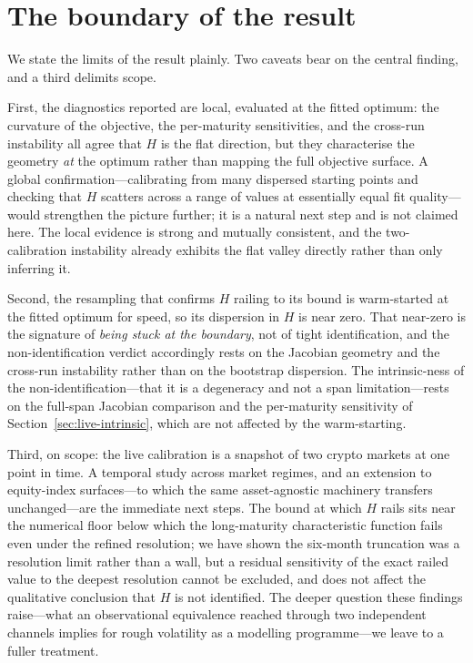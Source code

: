 \documentclass[11pt,a4paper]{article}
\numberwithin{equation}{section}
\begin{document}
\section{The boundary of the result}\label{sec:limitations}

We state the limits of the result plainly. Two caveats bear on the central finding, and a third
delimits scope.

First, the diagnostics reported are local, evaluated at the fitted optimum: the curvature of the
objective, the per-maturity sensitivities, and the cross-run instability all agree that $H$ is the
flat direction, but they characterise the geometry \emph{at} the optimum rather than mapping the full
objective surface. A global confirmation---calibrating from many dispersed starting points and
checking that $H$ scatters across a range of values at essentially equal fit quality---would
strengthen the picture further; it is a natural next step and is not claimed here. The local evidence
is strong and mutually consistent, and the two-calibration instability already exhibits the flat
valley directly rather than only inferring it.

Second, the resampling that confirms $H$ railing to its bound is warm-started at the fitted optimum for
speed, so its dispersion in $H$ is near zero. That near-zero is the signature of \emph{being stuck at
the boundary}, not of tight identification, and the non-identification verdict accordingly rests on the
Jacobian geometry and the cross-run instability rather than on the bootstrap dispersion. The
intrinsic-ness of the non-identification---that it is a degeneracy and not a span limitation---rests on
the full-span Jacobian comparison and the per-maturity sensitivity of Section~\ref{sec:live-intrinsic},
which are not affected by the warm-starting.

Third, on scope: the live calibration is a snapshot of two crypto markets at one point in time. A
temporal study across market regimes, and an extension to equity-index surfaces---to which the same
asset-agnostic machinery transfers unchanged---are the immediate next steps. The bound at which $H$
rails sits near the numerical floor below which the long-maturity characteristic function fails even
under the refined resolution; we have shown the six-month truncation was a resolution limit rather than
a wall, but a residual sensitivity of the exact railed value to the deepest resolution cannot be
excluded, and does not affect the qualitative conclusion that $H$ is not identified. The deeper
question these findings raise---what an observational equivalence reached through two independent
channels implies for rough volatility as a modelling programme---we leave to a fuller treatment.
\end{document}
